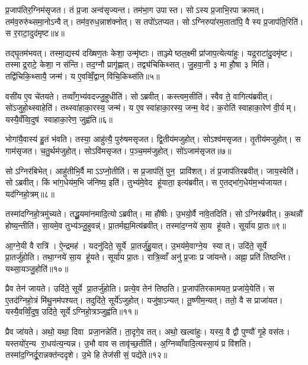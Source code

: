 प्र॒जाप॑तिर॒ग्निम॑सृजत। तं प्र॒जा अन्व॑सृज्यन्त। तम॑भा॒ग उपास्त। सोऽस्य प्र॒जाभि॒रपाक्रामत्। तम॑व॒रुरु॑थ्समा॒नोऽन्वैत्। तम॑व॒रुध॒न्नाश॑क्नोत्। स तपो॑ऽतप्यत। सोऽग्निरुपा॑रम॒ताता॑पि॒ वै स्य प्र॒जाप॑ति॒रिति॑। स र॒राटा॒दुद॑मृष्ट॥४॥

तद्घृ॒तम॑भवत्। तस्मा॒द्यस्य॑ दख्षिण॒तः केशा॒ उन्मृ॑ष्टाः। ताञ्ज्येष्ठल॒क्ष्मी प्रा॑जाप॒त्येत्या॑हुः। यद्र॒राटा॑दु॒दमृ॑ष्ट। तस्माद्र॒राटे॒ केशा॒ न स॑न्ति। तद॒ग्नौ प्रागृ॑ह्णात्। तद्व्य॑चिकिथ्सत्। जु॒हवा॒नी ३ मा हौ॒षा ३ मिति॑। तद्वि॑चिकि॒थ्सायै॒ जन्म॑। य ए॒वव्विँ॒द्वान् वि॑चि॒किथ्स॑ति॥५॥

वसी॑य ए॒व चे॑तयते। तव्वाँग॒भ्य॑वदज्जु॒हुधीति॑। सोऽब्रवीत्। कस्त्वम॒सीति॑। स्वैव ते॒ वागित्य॑ब्रवीत्। सो॑ऽजुहो॒थ्स्वाहेति॑। तथ्स्वा॑हाका॒रस्य॒ जन्म॑। य ए॒वस्वा॑हाका॒रस्य॒ जन्म॒ वेद॑। क॒रोति॑ स्वाहाका॒रेण॑ वी॒र्यम्। यस्यै॒वँव्वि॒दुष॑ स्वाहाका॒रेण॒ जुह्व॑ति॥६॥

भोगा॑यै॒वास्य॑ हु॒तं भ॑वति। तस्या॒ आहु॑त्यै॒ पुरु॑षमसृजत। द्वि॒तीय॑मजुहोत्। सोऽश्व॑मसृजत। तृ॒तीय॑मजुहोत्। स गाम॑सृजत। च॒तु॒र्थम॑जुहोत्। सोऽवि॑मसृजत। प॒ञ्च॒मम॑जुहोत्। सो॑ऽजाम॑सृजत॥७॥

सोऽग्निर॑बिभेत्। आहु॑तीभि॒र्वै माऽऽप्नो॒तीति॑। स प्र॒जाप॑तिं॒ पुन॒ प्रावि॑शत्। तं प्र॒जाप॑तिरब्रवीत्। जाय॒स्वेति॑। सोऽब्रवीत्। किं भा॑ग॒धेय॑म॒भि ज॑निष्य॒ इति॑। तुभ्य॑मे॒वेद हू॑याता॒ इत्य॑ब्रवीत्। स ए॒तद्भा॑ग॒धेय॑म॒भ्य॑जायत। यद॑ग्निहो॒त्रम्॥८॥

तस्मा॑दग्निहो॒त्रमु॑च्यते। तद्धू॒यमा॑नमादि॒त्योऽब्रवीत्। मा हौ॑षीः। उ॒भयो॒र्वै ना॑वे॒तदिति॑। सोऽग्निर॑ब्रवीत्। क॒थन्नौ॑ होष्य॒न्तीति॑। सा॒यमे॒व तुभ्य॑ञ्जु॒हुवन्न्॑। प्रा॒तर्मह्य॒मित्य॑ब्रवीत्। तस्मा॑द॒ग्नये॑ सा॒य हू॑यते। सूर्या॑य प्रा॒तः॥९॥

आ॒ग्ने॒यी वै रात्रि॑। ऐ॒न्द्रमह॑। यदनु॑दिते॒ सूर्ये प्रा॒तर्जु॑हु॒यात्। उ॒भय॑मे॒वाग्ने॒य स्यात्। उदि॑ते॒ सूर्ये प्रा॒तर्जु॑होति। तथा॒ग्नये॑ सा॒य हू॑यते। सूर्या॑य प्रा॒तः। रात्रि॒व्वाँ अनु॑ प्र॒जाः प्र जा॑यन्ते। अह्ना॒ प्रति॑ तिष्ठन्ति। यथ्सा॒यञ्जु॒होति॑॥१०॥

प्रैव तेन॑ जायते। उदि॑ते॒ सूर्ये प्रा॒तर्जु॑होति। प्रत्ये॒व तेन॑ तिष्ठति। प्र॒जाप॑तिरकामयत॒ प्रजा॑ये॒येति॑। स ए॒तद॑ग्निहो॒त्रं मि॑थु॒नम॑पश्यत्। तदुदि॑ते॒ सूर्ये॑ऽजुहोत्। यजु॑षा॒ऽन्यत्। तू॒ष्णीम॒न्यत्। ततो॒ वै स प्राजा॑यत। यस्यै॒वव्विँ॒दुष॒ उदि॑ते॒ सूर्येऽग्निहो॒त्रञ्जुह्व॑ति॥११॥

प्रैव जा॑यते। अथो॒ यथा॒ दिवा प्रजा॒नन्नेति॑। ता॒दृगे॒व तत्। अथो॒ खल्वा॑हुः। यस्य॒ वै द्वौ पुण्यौ॑ गृ॒हे वस॑तः। यस्तयो॑र॒न्य रा॒धय॑त्य॒न्यन्न। उ॒भौ वाव स तावृ॑च्छ॒तीति॑। अ॒ग्निव्वाँवादि॒त्यस्सा॒यं प्र वि॑शति। तस्मा॑द॒ग्निर्दू॒रान्नक्त॑न्ददृशे। उ॒भे हि तेज॑सी सं॒ पद्ये॑ते॥१२॥

